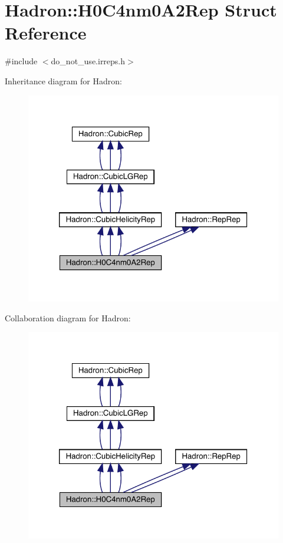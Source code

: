 \hypertarget{structHadron_1_1H0C4nm0A2Rep}{}\section{Hadron\+:\+:H0\+C4nm0\+A2\+Rep Struct Reference}
\label{structHadron_1_1H0C4nm0A2Rep}


{\ttfamily \#include $<$do\+\_\+not\+\_\+use.\+irreps.\+h$>$}



Inheritance diagram for Hadron\+:
\nopagebreak
\begin{figure}[H]
\begin{center}
\leavevmode
\includegraphics[width=320pt]{df/dab/structHadron_1_1H0C4nm0A2Rep__inherit__graph}
\end{center}
\end{figure}


Collaboration diagram for Hadron\+:
\nopagebreak
\begin{figure}[H]
\begin{center}
\leavevmode
\includegraphics[width=320pt]{d6/d77/structHadron_1_1H0C4nm0A2Rep__coll__graph}
\end{center}
\end{figure}

